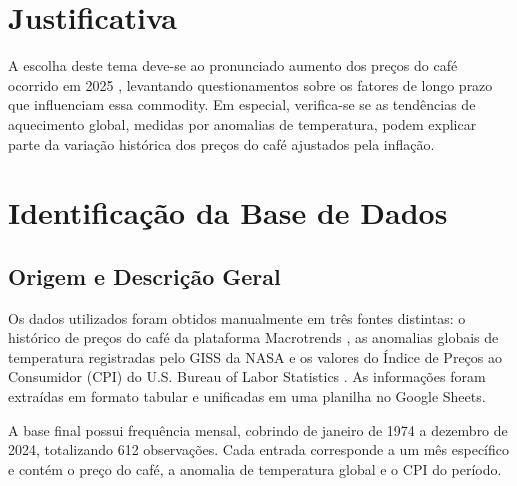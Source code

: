 \documentclass[12pt]{article}
\begin{document}
\section{Justificativa}
A escolha deste tema deve-se ao pronunciado aumento dos preços do café ocorrido em 2025 \cite{cnnbrasil:2025}, levantando questionamentos sobre os fatores de longo prazo que influenciam essa commodity. Em especial, verifica-se se as tendências de aquecimento global, medidas por anomalias de temperatura, podem explicar parte da variação histórica dos preços do café ajustados pela inflação.

\section{Identificação da Base de Dados}

\subsection{Origem e Descrição Geral}
Os dados utilizados foram obtidos manualmente em três fontes distintas: o histórico de preços do café da plataforma Macrotrends \cite{macrotrends}, as anomalias globais de temperatura registradas pelo GISS da NASA \cite{gistemp} e os valores do Índice de Preços ao Consumidor (CPI) do U.S. Bureau of Labor Statistics \cite{usbls}. As informações foram extraídas em formato tabular e unificadas em uma planilha no Google Sheets.

A base final possui frequência mensal, cobrindo de janeiro de 1974 a dezembro de 2024, totalizando 612 observações. Cada entrada corresponde a um mês específico e contém o preço do café, a anomalia de temperatura global e o CPI do período.
\end{document}
